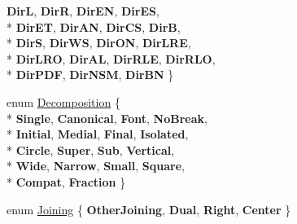 \begin{DoxyCompactItemize}
{\bfseries Dir\-L}, 
{\bfseries Dir\-R}, 
{\bfseries Dir\-E\-N}, 
{\bfseries Dir\-E\-S}, 
\\*
{\bfseries Dir\-E\-T}, 
{\bfseries Dir\-A\-N}, 
{\bfseries Dir\-C\-S}, 
{\bfseries Dir\-B}, 
\\*
{\bfseries Dir\-S}, 
{\bfseries Dir\-W\-S}, 
{\bfseries Dir\-O\-N}, 
{\bfseries Dir\-L\-R\-E}, 
\\*
{\bfseries Dir\-L\-R\-O}, 
{\bfseries Dir\-A\-L}, 
{\bfseries Dir\-R\-L\-E}, 
{\bfseries Dir\-R\-L\-O}, 
\\*
{\bfseries Dir\-P\-D\-F}, 
{\bfseries Dir\-N\-S\-M}, 
{\bfseries Dir\-B\-N}
 \}
\item 
enum \hyperlink{class_q_char_a9416cff6b11eb874218733dac5b6ea96}{Decomposition} \{ \\*
{\bfseries Single}, 
{\bfseries Canonical}, 
{\bfseries Font}, 
{\bfseries No\-Break}, 
\\*
{\bfseries Initial}, 
{\bfseries Medial}, 
{\bfseries Final}, 
{\bfseries Isolated}, 
\\*
{\bfseries Circle}, 
{\bfseries Super}, 
{\bfseries Sub}, 
{\bfseries Vertical}, 
\\*
{\bfseries Wide}, 
{\bfseries Narrow}, 
{\bfseries Small}, 
{\bfseries Square}, 
\\*
{\bfseries Compat}, 
{\bfseries Fraction}
 \}
\item 
enum \hyperlink{class_q_char_a7cb8fbdfaf179409190a2321ae0a10ed}{Joining} \{ {\bfseries Other\-Joining}, 
{\bfseries Dual}, 
{\bfseries Right}, 
{\bfseries Center}
 \}
\end{DoxyCompactItemize}
